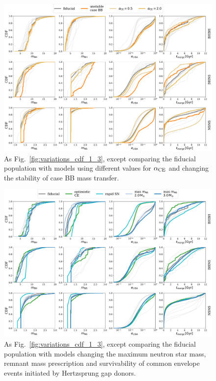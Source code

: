 \documentclass[twocolumn]{aastex63}
\begin{document}
\begin{figure}[h]
    \centering
    \includegraphics[width=\textwidth]{variations_cdf_4_6.pdf}
    \caption{As Fig.~\ref{fig:variations_cdf_1_3}, except comparing the fiducial population with models using different values for $\alpha_{\rm CE}$ and changing the stability of case BB mass transfer.}
    \label{fig:variations_cdf_4_6}
\end{figure}

\begin{figure}[h]
    \centering
    \includegraphics[width=\textwidth]{variations_cdf_7_10.pdf}
    \caption{As Fig.~\ref{fig:variations_cdf_1_3}, except comparing the fiducial population with models changing the maximum neutron star mass, remnant mass prescription and survivability of common envelope events initiated by Hertzsprung gap donors.}
    \label{fig:variations_cdf_7_10}
\end{figure}
\end{document}
